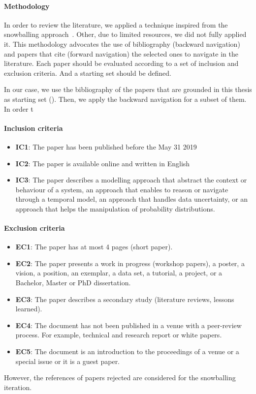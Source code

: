 \paragraph{Methodology}
In order to review the literature, we applied a technique inspired from the snowballing approach~\cite{DBLP:conf/ease/Wohlin14}.
Other, due to limited resources, we did not fully applied it.
This methodology advocates the use of bibliography (backward navigation) and papers that cite (forward navigation) the selected ones to navigate in the literature.
Each paper should be evaluated according to a set of inclusion and exclusion criteria.
And a starting set should be defined.

In our case, we use the bibliography of the papers that are grounded in this thesis as starting set (\cf {}).
Then, we apply the backward navigation for a subset of them.
In order t


\paragraph{Inclusion criteria}
\begin{itemize}
	\item \textbf{IC1}: The paper has been published before the May 31 2019
	\item \textbf{IC2}: The paper is available online and written in English
	\item \textbf{IC3}: The paper describes a modelling approach that abstract the context or behaviour of a system, an approach that enables to reason or navigate through a temporal model, an approach that handles data uncertainty, or an approach that helps the manipulation of probability distributions. %
\end{itemize}

\paragraph{Exclusion criteria}
\begin{itemize}
	\item \textbf{EC1}: The paper has at most 4 pages (short paper).
	\item \textbf{EC2}: The paper presents a work in progress (workshop papers), a poster, a vision, a position, an exemplar, a data set, a tutorial, a project, or a Bachelor, Master or PhD dissertation.
	\item \textbf{EC3}: The paper describes a secondary study (\eg literature reviews, lessons learned).
	\item \textbf{EC4}: The document has not been published in a venue with a peer-review process. For example, technical and research report or white papers.
	\item \textbf{EC5}: The document is an introduction to the proceedings of a venue or a special issue or it is a guest paper.
\end{itemize}

However, the references of papers rejected are considered for the snowballing iteration.